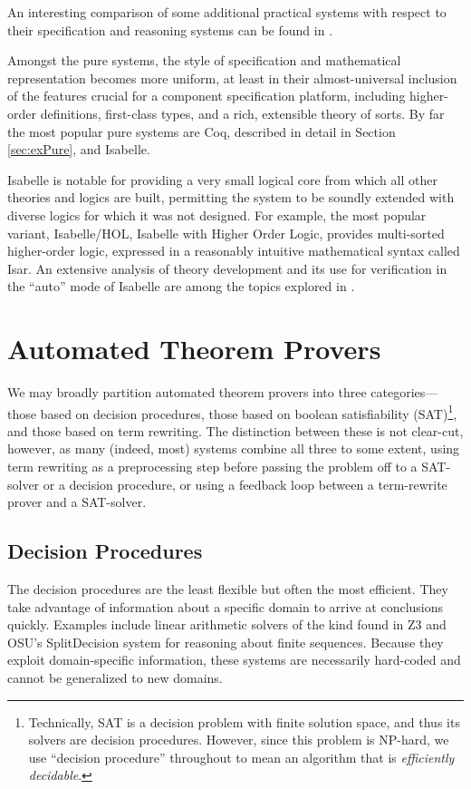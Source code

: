An interesting comparison of some additional practical systems with respect to their specification and reasoning systems can be found in \cite{bisl}.

Amongst the pure systems, the style of specification and mathematical representation becomes more uniform, at least in their almost-universal inclusion of the features crucial for a component specification platform, including higher-order definitions, first-class types, and a rich, extensible theory of sorts.  By far the most popular pure systems are Coq, described in detail in Section \ref{sec:exPure}, and Isabelle.

Isabelle is notable for providing a very small logical core from which all other theories and logics are built, permitting the system to be soundly extended with diverse logics for which it was not designed.  For example, the most popular variant, Isabelle/HOL, Isabelle with Higher Order Logic, provides multi-sorted higher-order logic, expressed in a reasonably intuitive mathematical syntax called Isar\cite{wenzelIsar}.  An extensive analysis of theory development and its use for verification in the ``auto'' mode of Isabelle are among the topics explored in \cite{kirschenbaumDissertation}.

\section{Automated Theorem Provers}\label{sec:overviewProvers}
We may broadly partition automated theorem provers into three categories---those based on decision procedures, those based on boolean satisfiability (SAT)\footnote{Technically, SAT is a decision problem with finite solution space, and thus its solvers are decision procedures.  However, since this problem is NP-hard, we use ``decision procedure'' throughout to mean an algorithm that is \emph{efficiently decidable}.}, and those based on term rewriting.  The distinction between these is not clear-cut, however, as many (indeed, most) systems combine all three to some extent, using term rewriting as a preprocessing step before passing the problem off to a SAT-solver or a decision procedure, or using a feedback loop between a term-rewrite prover and a SAT-solver.

\subsection{Decision Procedures} The decision procedures are the least flexible but often the most efficient.  They take advantage of information about a specific domain to arrive at conclusions quickly.  Examples include linear arithmetic solvers of the kind found in Z3\cite{deMouraZ3} and OSU's SplitDecision\cite{Sit11} system for reasoning about finite sequences.  Because they exploit domain-specific information, these systems are necessarily hard-coded and cannot be generalized to new domains.

